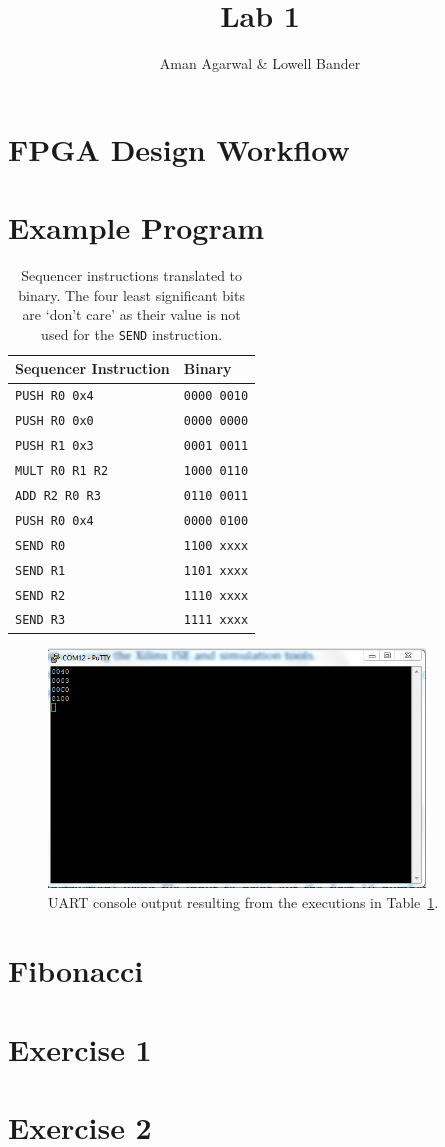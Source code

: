 \documentclass[]{article}
\newcommand{\subtitle}[1]{%
  \posttitle{%
    \par\end{center}
    \begin{center}\large#1\end{center}
    \vskip0.5em}%
}
\begin{document}
\title{Lab 1}
\subtitle{CS M152A}
\author{Aman Agarwal \& Lowell Bander}

\maketitle

\section{FPGA Design Workflow}
\section{Example Program}

\begin{table}[H]
\centering
\begin{tabular}{ l | l }
\textbf{Sequencer Instruction} & \textbf{Binary}\\\hline
\texttt{PUSH R0 0x4} & \texttt{0000 0010}\\
\texttt{PUSH R0 0x0} & \texttt{0000 0000}\\
\texttt{PUSH R1 0x3} & \texttt{0001 0011}\\
\texttt{MULT R0 R1 R2} & \texttt{1000 0110}\\
\texttt{ADD R2 R0 R3} & \texttt{0110 0011}\\
\texttt{PUSH R0 0x4} & \texttt{0000 0100}\\
\texttt{SEND R0} & \texttt{1100  xxxx}\\
\texttt{SEND R1} & \texttt{1101  xxxx}\\
\texttt{SEND R2} & \texttt{1110  xxxx}\\
\texttt{SEND R3} & \texttt{1111  xxxx}\\
\end{tabular}
\caption{Sequencer instructions translated to binary. The four least significant bits are `don't care' as their value is not used for the \texttt{SEND} instruction.}
\label{table:translation}
\end{table}

\begin{figure}[H]
\centering
\includegraphics[width=10cm]{translation.png}
\caption{UART console output resulting from the executions in Table~\ref{table:translation}.}
\end{figure}


\section{Fibonacci}
\section{Exercise 1}
\section{Exercise 2}
\end{document}
